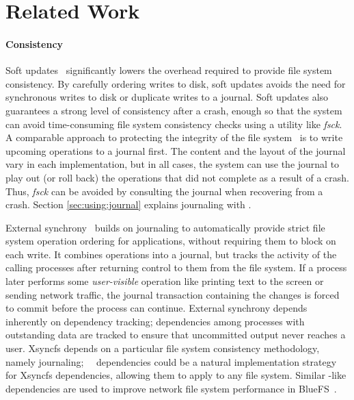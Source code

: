 \section{Related Work}
\label{sec:related}

\paragraph{Consistency}

Soft updates~\cite{ganger00soft} significantly lowers the overhead required to
provide file system consistency. By carefully ordering writes to disk, soft
updates avoids the need for synchronous writes to disk or duplicate writes to
a journal. Soft updates also guarantees a strong level of consistency after a
crash, enough so that the system can avoid time-consuming file system
consistency checks using a utility like \emph{fsck}. 
%
A comparable approach to protecting the integrity of the file
system~\cite{seltzer00journaling} is to write
upcoming operations to a journal first. The content and the layout of the
journal vary in each implementation, but in all cases, the system can use the
journal to play out (or roll back) the operations that did not complete as a
result of a crash. Thus, \emph{fsck} can be avoided by consulting the journal
when recovering from a crash.  Section \ref{sec:using:journal} explains
journaling with \patches.

External synchrony~\cite{nightingale06rethink} builds on journaling to
automatically provide strict file system operation ordering for applications,
without requiring them to block on each write. It combines operations into a
journal, but tracks the activity of the calling processes after returning
control to them from the file system. If a process later performs some
\emph{user-visible} operation like printing text to the screen or sending
network traffic, the journal transaction containing the changes is forced to
commit before the process can continue.
%
External synchrony depends inherently on dependency tracking; dependencies
among processes with outstanding data are tracked to ensure that
uncommitted output never reaches a user.  Xsyncfs depends on a particular
file system consistency methodology, namely journaling; \Kudos\ \patch\
dependencies could be a natural implementation strategy for Xsyncfs
dependencies, allowing them to apply to any file system.
%
Similar \patch-like dependencies are used to improve network file system
performance in BlueFS~\cite{nightingale05speculative}.

